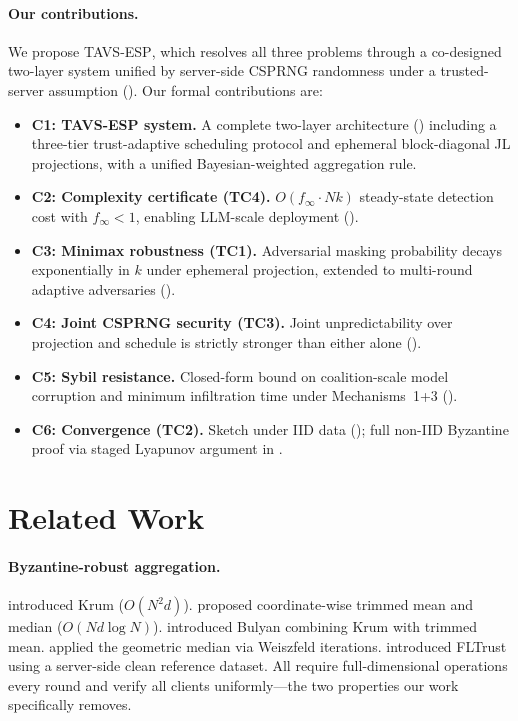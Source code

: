 \documentclass{article}
\newcommand{\finf}{f_{\infty}}       %
\newcommand{\TAVESP}{\textsc{TAVS-ESP}}
\begin{document}
\paragraph{Our contributions.}
We propose \TAVESP{}, which resolves all three problems through a co-designed
two-layer system unified by server-side CSPRNG randomness under a
trusted-server assumption ().
Our formal contributions are:

\begin{itemize}
  \item \textbf{C1: \TAVESP{} system.} A complete two-layer architecture
    () including a three-tier trust-adaptive scheduling
    protocol and ephemeral block-diagonal JL projections, with a unified
    Bayesian-weighted aggregation rule.
  \item \textbf{C2: Complexity certificate (TC4).} $O(\finf \cdot Nk)$
    steady-state detection cost with $\finf < 1$, enabling LLM-scale
    deployment ().
  \item \textbf{C3: Minimax robustness (TC1).} Adversarial masking probability
    decays exponentially in $k$ under ephemeral projection, extended to
    multi-round adaptive adversaries ().
  \item \textbf{C4: Joint CSPRNG security (TC3).} Joint unpredictability over
    projection and schedule is strictly stronger than either alone
    ().
  \item \textbf{C5: Sybil resistance.} Closed-form bound on coalition-scale
    model corruption and minimum infiltration time under Mechanisms~1+3
    ().
  \item \textbf{C6: Convergence (TC2).} Sketch under IID data
    (); full non-IID Byzantine proof via staged
    Lyapunov argument in .
\end{itemize}

\section{Related Work}
\label{sec:related}

\paragraph{Byzantine-robust aggregation.}
\citet{blanchard2017machine} introduced Krum ($O(N^2 d)$).
\citet{yin2018byzantine} proposed coordinate-wise trimmed mean and median
($O(Nd\log N)$).
\citet{elmhamdi2018hidden} introduced Bulyan combining Krum with trimmed mean.
\citet{pillutla2022robust} applied the geometric median via Weiszfeld
iterations.
\citet{cao2022fltrust} introduced FLTrust using a server-side clean reference
dataset.
All require full-dimensional operations every round and verify all clients
uniformly---the two properties our work specifically removes.
\end{document}
